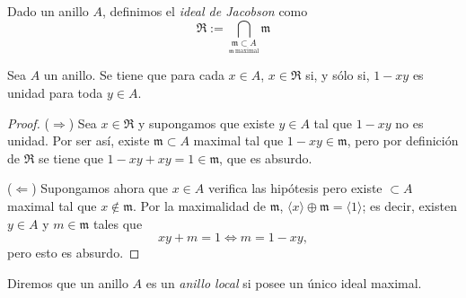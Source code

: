 \documentclass[./main.tex]{subfiles}
\begin{document}
	\begin{definition}
		Dado un anillo $A$, definimos el \textit{ideal de Jacobson} como $$\mathfrak R:=\bigcap_{\underset{\mathfrak m\ \text{maximal}}{\mathfrak m\subset A}}\mathfrak m$$
	\end{definition}

	\begin{proposition}
		Sea $A$ un anillo. Se tiene que para cada $x\in A$, $x\in\mathfrak R$ si, y sólo si, $1-xy$ es unidad para toda $y\in A$.
	\end{proposition}
	\begin{proof}
		($\Rightarrow$) Sea $x\in\mathfrak{R}$ y supongamos que existe $y\in A$ tal que $1-xy$ no es unidad. Por ser así, existe $\mathfrak m\subset A$ maximal tal que $1-xy\in\mathfrak m$, pero por definición de $\mathfrak R$ se tiene que $1-xy+xy=1\in\mathfrak m$, que es absurdo.

		($\Leftarrow$) Supongamos ahora que $x\in A$ verifica las hipótesis pero existe $\mathfrak\subset A$ maximal tal que $x\notin\mathfrak m$. Por la maximalidad de $\mathfrak m$, $\langle x\rangle\oplus \mathfrak m=\langle 1\rangle$; es decir, existen $y\in A$ y $m\in\mathfrak m$ tales que
		$$xy +m=1\Longleftrightarrow m=1-xy,$$
		pero esto es absurdo.
	\end{proof}

	\begin{definition}
		Diremos que un anillo $A$ es un \textit{anillo local} si posee un único ideal maximal.
	\end{definition}
\end{document}
